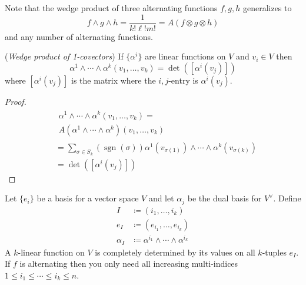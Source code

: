 Note that the wedge product of three alternating functions \(f,g,h\) generalizes to 
\begin{equation}
    f \wedge g \wedge h = \frac{1}{k!\ell!m!} = A(f\otimes g \otimes h)
\end{equation}
and any number of alternating functions.

\begin{proposition}
    (\textit{Wedge product of 1-covectors}) If \(\{\alpha^i\}\) are linear functions on \(V\) and \(v_i \in V\) then 
    \begin{equation}
        \alpha^1 \wedge \cdots \wedge \alpha^k (v_1, \dots, v_k) = \det([\alpha^i(v_j)])
    \end{equation}
    where \([\alpha^i(v_j)]\) is the matrix where the \(i,j\)-entry is \(\alpha^i(v_j)\).
\end{proposition}

\begin{proof}
    \begin{align}
        &\begin{multlined}
        \alpha^1 \wedge \cdots \wedge \alpha^k (v_1, \dots, v_k) = \\  
        A(\alpha^1 \wedge \cdots \wedge \alpha^k) (v_1, \dots, v_k)
        \end{multlined} \\
        &= \sum_{\sigma \in S_k} (\operatorname{sgn}(\sigma)) \alpha^1 (v_{\sigma(1)}) \wedge \cdots \wedge \alpha^k (v_{\sigma(k)}) \\ 
        &= \det([\alpha^i(v_j)])
    \end{align}
\end{proof}

Let \(\{e_i\}\) be a basis for a vector space \(V\) and let \(\alpha_j\) be the dual basis for \(V^\vee\).
%
Define 
%
\begin{equation}
\begin{split}
    I &\coloneqq (i_1, \dots, i_k)  \\
    e_I &\coloneqq (e_{i_1}, \dots, e_{i_k})  \\
    \alpha_I &\coloneqq \alpha^{i_1} \wedge \cdots \wedge \alpha^{i_k}
\end{split}
\end{equation}
%
A \(k\)-linear function on \(V\) is completely determined by its values on all \(k\)-tuples \(e_I\).
%
If \(f\) is alternating then you only need all increasing multi-indices \(1 \leq i_1 \leq \cdots \leq i_k \leq n\).



